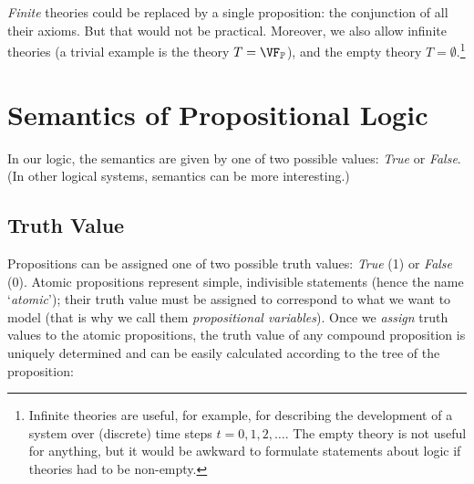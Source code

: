 \emph{Finite} theories could be replaced by a single proposition: the conjunction of all their axioms. But that would not be practical. Moreover, we also allow infinite theories (a trivial example is the theory $T = \VF_\mathbb P$), and the empty theory $T = \emptyset$.\footnote{Infinite theories are useful, for example, for describing the development of a system over (discrete) time steps $t = 0, 1, 2, \dots$. The empty theory is not useful for anything, but it would be awkward to formulate statements about logic if theories had to be non-empty.}


\section{Semantics of Propositional Logic}

In our logic, the semantics are given by one of two possible values: \emph{True} or \emph{False}. (In other logical systems, semantics can be more interesting.)


\subsection{Truth Value}

Propositions can be assigned one of two possible truth values: \emph{True} (1) or \emph{False} (0). Atomic propositions represent simple, indivisible statements (hence the name `\emph{atomic}'); their truth value must be assigned to correspond to what we want to model (that is why we call them \emph{propositional variables}). Once we \emph{assign} truth values to the atomic propositions, the truth value of any compound proposition is uniquely determined and can be easily calculated according to the tree of the proposition:

